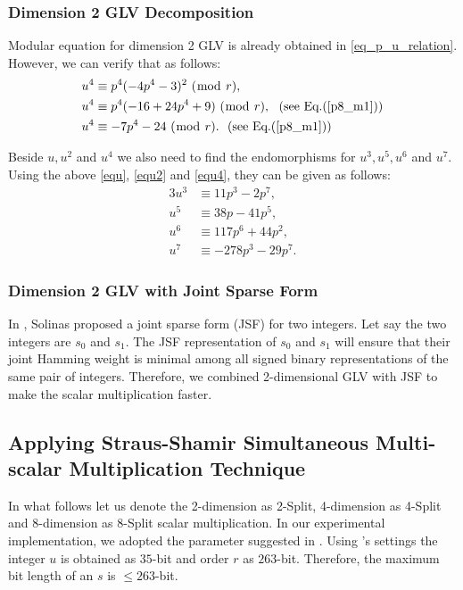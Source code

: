 \subsubsection{Dimension 2 GLV Decomposition}
 Modular equation for dimension 2 GLV is already obtained in \eqref{eq_p_u_relation}.
However, we can verify that as follows:
\begin{alignat}{3}
u^4 &\equiv p^4(-4p^4-3)^2~(\bmod~r), \nonumber \\
u^4 &\equiv p^4(-16+24p^4+9)~(\bmod~r),  ~~(\text{see~Eq.}(\ref{p8_m1})) \nonumber \\
u^4 &\equiv -7p^4-24~(\bmod~r). ~~(\text{see~Eq.}(\ref{p8_m1})) \label{equ4}
\end{alignat}

Beside $u, u^2$ and $u^4$ we also need to find the endomorphisms for $u^3, u^5, u^6$ and $u^7$.
Using the above \eqref{equ}, \eqref{equ2} and \eqref{equ4}, they can be given as follows:
\begin{alignat}{3}
 u^3 & \equiv  11p^3-2p^7, \nonumber \\
 u^5 & \equiv 38p -41p^5,\nonumber \\
 u^6 & \equiv  117p^6+44p^2, \nonumber \\
 u^7 & \equiv  -278p^3 -29p^7. \nonumber 
\end{alignat}

\subsubsection{Dimension 2 GLV with Joint Sparse Form}
In \cite{solinas2001JFS}, Solinas proposed a joint sparse form (JSF) for two integers. 
Let say the two integers are $s_0$ and $s_1$. 
The JSF representation of $s_0$ and $s_1$ will ensure that their joint Hamming weight is minimal among all signed binary representations of the same pair of integers. 
Therefore, we combined 2-dimensional GLV with JSF to make the scalar multiplication faster.

\subsection{Applying Straus-Shamir Simultaneous Multi-scalar Multiplication Technique}
In what follows let us denote the 2-dimension as 2-Split, 4-dimension as 4-Split
and 8-dimension as 8-Split scalar multiplication.
In our experimental implementation, we adopted the parameter suggested in \cite{EPRINT:BarDuq17}. 
Using \cite{EPRINT:BarDuq17}'s settings the integer  $u$ is obtained as $35$-bit and order $r$ as $263$-bit. 
Therefore, the maximum bit length of an $s$ is $\leq 263$-bit.
